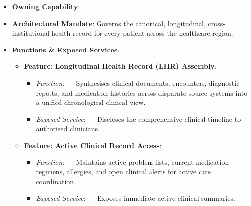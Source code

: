 \begin{itemize}

\item 
\textbf{Owning Capability}: \texttt{}



\item 
\textbf{Architectural Mandate}: Governs the canonical, longitudinal, cross-institutional health record for every patient across the healthcare region.



\item 
\textbf{Functions \& Exposed Services}:


\begin{itemize}

\item 
\textbf{Feature: Longitudinal Health Record (LHR) Assembly}:


\begin{itemize}

\item 
\emph{Function}: \texttt{} — Synthesises clinical documents, encounters, diagnostic reports, and medication histories across disparate source systems into a unified chronological clinical view.



\item 
\emph{Exposed Service}: \texttt{} — Discloses the comprehensive clinical timeline to authorised clinicians.



\end{itemize}


\item 
\textbf{Feature: Active Clinical Record Access}:


\begin{itemize}

\item 
\emph{Function}: \texttt{} — Maintains active problem lists, current medication regimens, allergies, and open clinical alerts for active care coordination.



\item 
\emph{Exposed Service}: \texttt{} — Exposes immediate active clinical summaries.




\end{itemize}
\end{itemize}
\end{itemize}
